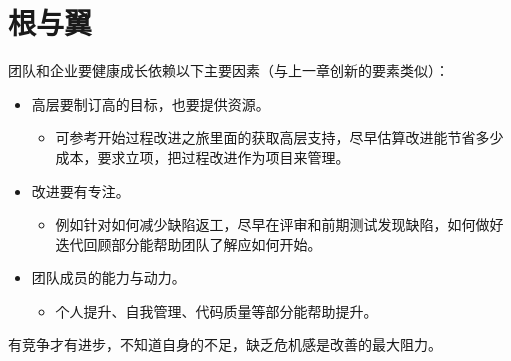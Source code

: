 \chapter{根与翼} %


团队和企业要健康成长依赖以下主要因素（与上一章创新的要素类似）：\\

\begin{itemize}
\item
  高层要制订高的目标，也要提供资源。

  \begin{itemize}
  \tightlist
  \item
    可参考开始过程改进之旅里面的获取高层支持，尽早估算改进能节省多少成本，要求立项，把过程改进作为项目来管理。
  \end{itemize}
\item
  改进要有专注。

  \begin{itemize}
  \tightlist
  \item
    例如针对如何减少缺陷返工，尽早在评审和前期测试发现缺陷，如何做好迭代回顾部分能帮助团队了解应如何开始。
  \end{itemize}


\item
  团队成员的能力与动力。

  \begin{itemize}
  \tightlist
  \item
    个人提升、自我管理、代码质量等部分能帮助提升。
  \end{itemize}
\end{itemize}

有竞争才有进步，不知道自身的不足，缺乏危机感是改善的最大阻力。

